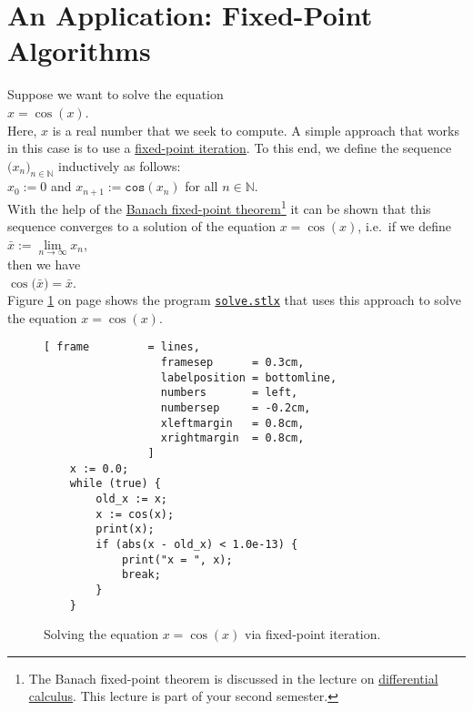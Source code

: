 \section{An Application: Fixed-Point Algorithms}
Suppose we want to solve the equation \\[0.2cm]
\hspace*{1.3cm} $x = \cos(x)$. \\[0.2cm]
Here, $x$ is a real number that we seek to compute.  A simple approach that works in this case is to use a
\href{https://en.wikipedia.org/wiki/Fixed-point_iteration}{fixed-point iteration}.  To this end, we
define the sequence $\bigl(x_n\bigr)_{n\in\mathbb{N}}$ inductively as follows:
\\[0.2cm]
\hspace*{1.3cm} 
$x_0 := 0$ \quad and \quad $x_{n+1} := \mathtt{cos}(x_n)$ \quad for all $n \in \mathbb{N}$. 
\\[0.2cm]
With the help of the 
\href{https://en.wikipedia.org/wiki/Banach_fixed-point_theorem}{Banach fixed-point theorem}\footnote{
  The Banach fixed-point theorem is discussed in the lecture on
  \href{https://en.wikipedia.org/wiki/Differential_calculus}{differential calculus}.  This lecture is part of your
  second semester.
}
it can be shown that this sequence converges to a solution of the equation $x = \cos(x)$, i.e.~if we define
\\[0.2cm]
\hspace*{1.3cm}
$\bar{x} := \lim\limits_{n\rightarrow\infty} x_n$,
\\[0.2cm]
then we have
\\[0.2cm]
\hspace*{1.3cm}
$\cos\bigl(\bar{x}\bigr) = \bar{x}$.
\\[0.2cm]
Figure \ref{fig:solve.stlx} on page \pageref{fig:solve.stlx} shows the program
\href{https://github.com/karlstroetmann/Logik/blob/master/SetlX/solve.stlx}{\texttt{solve.stlx}}
that uses this approach to solve the equation $x = \cos(x)$.


\begin{figure}[!ht]
  \centering
\begin{Verbatim}[ frame         = lines, 
                  framesep      = 0.3cm, 
                  labelposition = bottomline,
                  numbers       = left,
                  numbersep     = -0.2cm,
                  xleftmargin   = 0.8cm,
                  xrightmargin  = 0.8cm,
                ]
    x := 0.0;
    while (true) {
        old_x := x;
        x := cos(x);    
        print(x);
        if (abs(x - old_x) < 1.0e-13) {
            print("x = ", x);
            break;
        }   
    }
\end{Verbatim} 
\vspace*{-0.3cm}
\caption{Solving the equation $x = \cos(x)$ via fixed-point iteration.}  \label{fig:solve.stlx}
\end{figure} %

